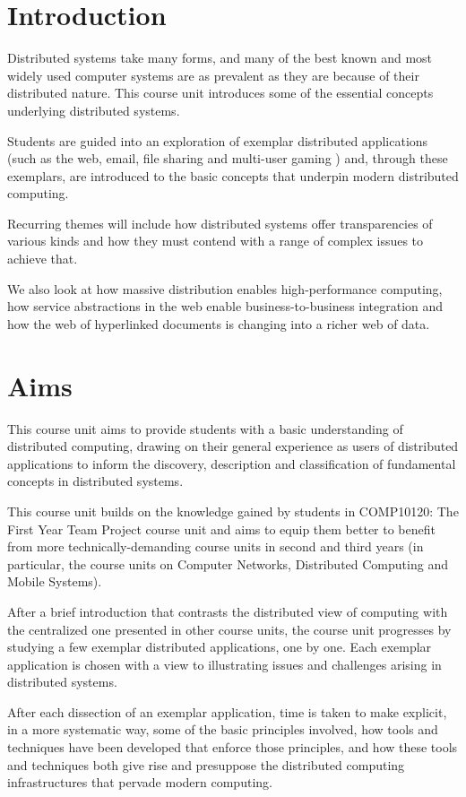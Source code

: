 \section*{Introduction}

Distributed systems take many forms, and many of the best known and most widely
used computer systems are as prevalent as they are because of their distributed
nature. This course unit introduces some of the essential concepts underlying
distributed systems.

Students are guided into an exploration of exemplar distributed applications
(such as the web, email, file sharing and multi-user gaming ) and, through these
exemplars, are introduced to the basic concepts that underpin modern distributed
computing.

Recurring themes will include how distributed systems offer transparencies of
various kinds and how they must contend with a range of complex issues to
achieve that.

We also look at how massive distribution enables high-performance computing, how
service abstractions in the web enable business-to-business integration and how
the web of hyperlinked documents is changing into a richer web of data.

\section*{Aims}

This course unit aims to provide students with a basic understanding of
distributed computing, drawing on their general experience as users of
distributed applications to inform the discovery, description and classification
of fundamental concepts in distributed systems.

This course unit builds on the knowledge gained by students in COMP10120: The
First Year Team Project course unit and aims to equip them better to benefit
from more technically-demanding course units in second and third years (in
particular, the course units on Computer Networks, Distributed Computing and
Mobile Systems).

After a brief introduction that contrasts the distributed view of computing with
the centralized one presented in other course units, the course unit progresses
by studying a few exemplar distributed applications, one by one. Each exemplar
application is chosen with a view to illustrating issues and challenges arising
in distributed systems.

After each dissection of an exemplar application, time is taken to make
explicit, in a more systematic way, some of the basic principles involved, how
tools and techniques have been developed that enforce those principles, and how
these tools and techniques both give rise and presuppose the distributed
computing infrastructures that pervade modern computing.

